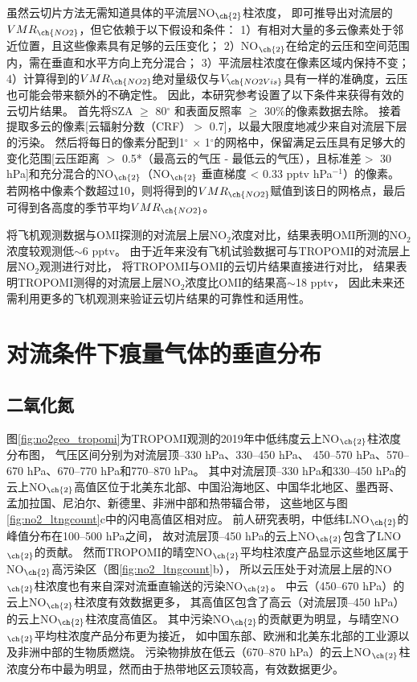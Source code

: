 虽然云切片方法无需知道具体的平流层NO$_{\ch{2}}$柱浓度，
即可推导出对流层的$VMR_{\ch{NO2}}$，但它依赖于以下假设和条件：
1）有相对大量的多云像素处于邻近位置，且这些像素具有足够的云压变化；
2）NO$_{\ch{2}}$在给定的云压和空间范围内，需在垂直和水平方向上充分混合；
3）平流层柱浓度在像素区域内保持不变；
4）计算得到的$VMR_{\ch{NO2}}$绝对量级仅与$V_{\ch{NO2Vis}}$具有一样的准确度，云压也可能会带来额外的不确定性。
因此，本研究参考\citet{Marais.2021}设置了以下条件来获得有效的云切片结果。
首先将SZA $\geq$ 80$^{\circ}$ 和表面反照率 $\geq$  30\%的像素数据去除。
接着提取多云的像素[云辐射分数（CRF）$>$ 0.7]，以最大限度地减少来自对流层下层的污染。
然后将每日的像素分配到1$^{\circ}$ $\times$ 1$^{\circ}$的网格中，保留满足云压具有足够大的变化范围[云压距离 $>$ 0.5*（最高云的气压 - 最低云的气压），且标准差$>$ 30 hPa]和充分混合的NO$_{\ch{2}}$（NO$_{\ch{2}}$ 垂直梯度 < 0.33 pptv hPa$^{-1}$）的像素。
若网格中像素个数超过10，则将得到的$VMR_{\ch{NO2}}$赋值到该日的网格点，最后可得到各高度的季节平均$VMR_{\ch{NO2}}$。

\citet{Marais.2018}将飞机观测数据与OMI探测的对流层上层NO$_2$浓度对比，结果表明OMI所测的NO$_2$浓度较观测低$\sim$6 pptv。
由于近年来没有飞机试验数据可与TROPOMI的对流层上层NO$_2$观测进行对比，
\citet{Marais.2021}将TROPOMI与OMI的云切片结果直接进行对比，
结果表明TROPOMI测得的对流层上层NO$_2$浓度比OMI的结果高$\sim$18 pptv，
因此未来还需利用更多的飞机观测来验证云切片结果的可靠性和适用性。


\section{对流条件下痕量气体的垂直分布} \label{sec:cld_profile}

\subsection{二氧化氮}


图\ref{fig:no2geo_tropomi}为TROPOMI观测的2019年中低纬度云上NO$_{\ch{2}}$柱浓度分布图，
气压区间分别为对流层顶--330 hPa、330--450 hPa、
450--570 hPa、570--670 hPa、670--770 hPa和770--870 hPa。
其中对流层顶--330 hPa和330--450 hPa的云上NO$_{\ch{2}}$高值区位于北美东北部、中国沿海地区、中国华北地区、墨西哥、
孟加拉国、尼泊尔、新德里、非洲中部和热带辐合带，
这些地区与图\ref{fig:no2_ltngcount}c中的闪电高值区相对应。
前人研究表明，中低纬LNO$_{\ch{2}}$的峰值分布在100--500 hPa之间\citep{Pickering.1988,Ott.2010,Luo.2017}，
故对流层顶--450 hPa的云上NO$_{\ch{2}}$包含了LNO$_{\ch{2}}$的贡献。
然而TROPOMI的晴空NO$_{\ch{2}}$平均柱浓度产品显示这些地区属于NO$_{\ch{2}}$高污染区（图\ref{fig:no2_ltngcount}b），
所以云压处于对流层上层的NO$_{\ch{2}}$柱浓度也有来自深对流垂直输送的污染NO$_{\ch{2}}$。
中云（450--670 hPa）的云上NO$_{\ch{2}}$柱浓度有效数据更多，
其高值区包含了高云（对流层顶--450 hPa）的云上NO$_{\ch{2}}$柱浓度高值区。
其中污染NO$_{\ch{2}}$的贡献更为明显，与晴空NO$_{\ch{2}}$平均柱浓度产品分布更为接近，
如中国东部、欧洲和北美东北部的工业源以及非洲中部的生物质燃烧。
污染物排放在低云（670--870 hPa）的云上NO$_{\ch{2}}$柱浓度分布中最为明显，然而由于热带地区云顶较高，有效数据更少。

